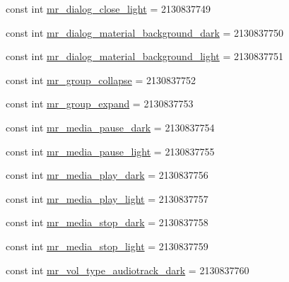 \begin{DoxyCompactItemize}
\item 
const int \mbox{\hyperlink{class_f_w_p_s___app_1_1_droid_1_1_resource_1_1_drawable_a8032fbddd9486ca24ad75d373c1b50a5}{mr\+\_\+dialog\+\_\+close\+\_\+light}} = 2130837749
\item 
const int \mbox{\hyperlink{class_f_w_p_s___app_1_1_droid_1_1_resource_1_1_drawable_ac76d99f2f2a790d4b21ebcf61d07066a}{mr\+\_\+dialog\+\_\+material\+\_\+background\+\_\+dark}} = 2130837750
\item 
const int \mbox{\hyperlink{class_f_w_p_s___app_1_1_droid_1_1_resource_1_1_drawable_a4c13c5b141dbd805641cacba42b3f9c3}{mr\+\_\+dialog\+\_\+material\+\_\+background\+\_\+light}} = 2130837751
\item 
const int \mbox{\hyperlink{class_f_w_p_s___app_1_1_droid_1_1_resource_1_1_drawable_a19456220ea4d67bcc6fdeef82200be74}{mr\+\_\+group\+\_\+collapse}} = 2130837752
\item 
const int \mbox{\hyperlink{class_f_w_p_s___app_1_1_droid_1_1_resource_1_1_drawable_a2b4669a86c806cd6147e1d87dcc144af}{mr\+\_\+group\+\_\+expand}} = 2130837753
\item 
const int \mbox{\hyperlink{class_f_w_p_s___app_1_1_droid_1_1_resource_1_1_drawable_a5462c29f72564d7438ceed4170345405}{mr\+\_\+media\+\_\+pause\+\_\+dark}} = 2130837754
\item 
const int \mbox{\hyperlink{class_f_w_p_s___app_1_1_droid_1_1_resource_1_1_drawable_a6d4bc396bb07460bd5c837998874b387}{mr\+\_\+media\+\_\+pause\+\_\+light}} = 2130837755
\item 
const int \mbox{\hyperlink{class_f_w_p_s___app_1_1_droid_1_1_resource_1_1_drawable_a7e8324cc547fd52a79d3dc6ec341d729}{mr\+\_\+media\+\_\+play\+\_\+dark}} = 2130837756
\item 
const int \mbox{\hyperlink{class_f_w_p_s___app_1_1_droid_1_1_resource_1_1_drawable_a65fbf922943c736091c33154caafe735}{mr\+\_\+media\+\_\+play\+\_\+light}} = 2130837757
\item 
const int \mbox{\hyperlink{class_f_w_p_s___app_1_1_droid_1_1_resource_1_1_drawable_a6728ddd3cf4b67e7facc067c5d733e22}{mr\+\_\+media\+\_\+stop\+\_\+dark}} = 2130837758
\item 
const int \mbox{\hyperlink{class_f_w_p_s___app_1_1_droid_1_1_resource_1_1_drawable_a9f15937509988bd31934e53145aefc46}{mr\+\_\+media\+\_\+stop\+\_\+light}} = 2130837759
\item 
const int \mbox{\hyperlink{class_f_w_p_s___app_1_1_droid_1_1_resource_1_1_drawable_af42a01a77a63092f2d7c33a04045d946}{mr\+\_\+vol\+\_\+type\+\_\+audiotrack\+\_\+dark}} = 2130837760

\end{DoxyCompactItemize}

